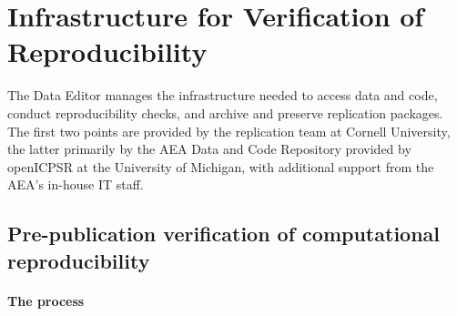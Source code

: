 \documentclass[PP]{AEA}
\newcommand{\aeadcr}{AEA Data and Code Repository}
\begin{document}
\section{Infrastructure for Verification of Reproducibility}
\label{sec:infrastructure}

The Data Editor manages the infrastructure needed to access data and code, conduct reproducibility checks, and archive and preserve replication packages. The first two points are provided by the replication team at Cornell University, the latter primarily by the  \aeadcr{} provided by openICPSR at the University of Michigan, with additional support from the AEA's in-house IT staff. 


\subsection{Pre-publication verification of computational reproducibility}
\label{sec:verification}

\paragraph{The process}
\end{document}
